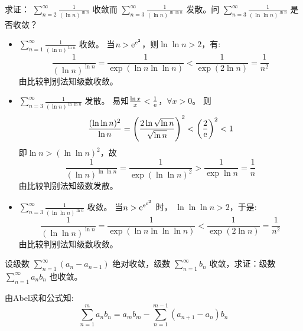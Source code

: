 \begin{problem}
    求证： \(\sum_{n=2}^{\infty} \frac{1}{(\ln n)^{\ln n}}\) 收敛而
    \(\sum_{n=3}^{\infty} \frac{1}{(\ln n)^{\ln \ln n}}\) 发散。问
    \(\sum_{n=3}^{\infty} \frac{1}{(\ln \ln n)^{\ln n}}\) 是否收敛？
\end{problem}

\begin{solution}
    \begin{itemize}
        \item \(\sum_{n=1}^{\infty} \frac{1}{(\ln n)^{\ln n}}\) 收敛。
            当\(n > \mathrm{e}^{\mathrm{e}^{2}}\)，则\(\ln \ln n > 2\)，有:
            \[
                \frac{1}{(\ln n)^{\ln n}} = \frac{1}{\exp(\ln n
                \ln\ln n)} < \frac{1}{\exp(2\ln n)} = \frac{1}{n^2}
            \]
            由比较判别法知级数收敛。
        \item \(\sum_{n=3}^{\infty} \frac{1}{(\ln n)^{\ln
            \ln n}}\) 发散。
            易知\(\frac{\ln x}{x} < \frac{1}{\mathrm{e}}\)，\(\forall x > 0\)。
            则\[
                \frac{(\ln\ln n)^{2}}{\ln n} = \left( \frac{2\ln
                \sqrt{\ln n}}{\sqrt{\ln n}} \right)^{2} < \left(
                \frac{2}{\mathrm{e}} \right)^{2} < 1
            \]
            即\(\ln n > (\ln \ln n)^{2}\)，故\[
                \frac{1}{(\ln n)^{\ln \ln n}} = \frac{1}{\exp(\ln\ln
                n)^{2}} > \frac{1}{\exp \ln n} = \frac{1}{n}
            \]
            由比较判别法知级数发散。
        \item \(\sum_{n=3}^{\infty} \frac{1}{(\ln \ln
            n)^{\ln n}}\) 收敛。
            当\(n > \mathrm{e}^{\mathrm{e}^{\mathrm{e}^{2}}}\) 时，
            \(\ln\ln\ln n > 2\)，于是: \[
                \frac{1}{(\ln \ln n)^{\ln n}} = \frac{1}{\exp(\ln n
                \ln\ln\ln n)} < \frac{1}{\exp(2\ln n)} = \frac{1}{n^2}
            \]
            由比较判别法知级数收敛。
    \end{itemize}
\end{solution}
\setcounter{problems}{11}
\begin{problem}
    设级数 \(\sum_{n=1}^{\infty} (a_n - a_{n-1})\) 绝对收敛，级数
    \(\sum_{n=1}^{\infty} b_n\) 收敛，求证：级数
    \(\sum_{n=1}^{\infty} a_n b_n\) 也收敛。
\end{problem}

\begin{solution}
    由Abel求和公式知: \[
        \sum_{n=1}^{m} a_{n}b_{n} = a_{m}b_{m} - \sum_{n=1}^{m-1}
        (a_{n+1} - a_{n})b_{n}
    \]

\end{solution}
